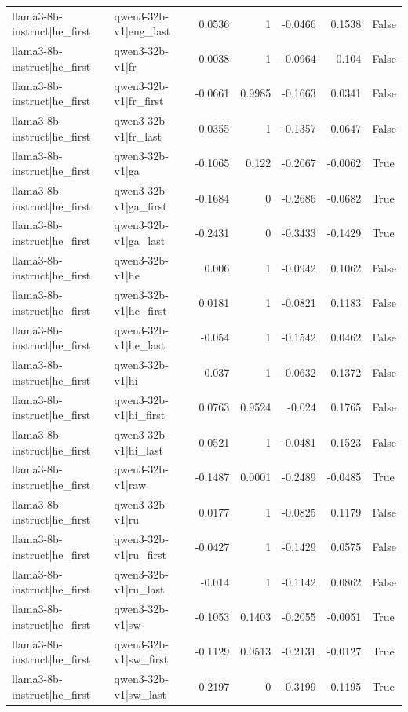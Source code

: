 \begin{table}
\begin{tabular}{l l r r r r l}
llama3-8b-instruct|he_first & qwen3-32b-v1|eng_last & 0.0536 & 1 & -0.0466 & 0.1538 & False \\
llama3-8b-instruct|he_first & qwen3-32b-v1|fr & 0.0038 & 1 & -0.0964 & 0.104 & False \\
llama3-8b-instruct|he_first & qwen3-32b-v1|fr_first & -0.0661 & 0.9985 & -0.1663 & 0.0341 & False \\
llama3-8b-instruct|he_first & qwen3-32b-v1|fr_last & -0.0355 & 1 & -0.1357 & 0.0647 & False \\
llama3-8b-instruct|he_first & qwen3-32b-v1|ga & -0.1065 & 0.122 & -0.2067 & -0.0062 & True \\
llama3-8b-instruct|he_first & qwen3-32b-v1|ga_first & -0.1684 & 0 & -0.2686 & -0.0682 & True \\
llama3-8b-instruct|he_first & qwen3-32b-v1|ga_last & -0.2431 & 0 & -0.3433 & -0.1429 & True \\
llama3-8b-instruct|he_first & qwen3-32b-v1|he & 0.006 & 1 & -0.0942 & 0.1062 & False \\
llama3-8b-instruct|he_first & qwen3-32b-v1|he_first & 0.0181 & 1 & -0.0821 & 0.1183 & False \\
llama3-8b-instruct|he_first & qwen3-32b-v1|he_last & -0.054 & 1 & -0.1542 & 0.0462 & False \\
llama3-8b-instruct|he_first & qwen3-32b-v1|hi & 0.037 & 1 & -0.0632 & 0.1372 & False \\
llama3-8b-instruct|he_first & qwen3-32b-v1|hi_first & 0.0763 & 0.9524 & -0.024 & 0.1765 & False \\
llama3-8b-instruct|he_first & qwen3-32b-v1|hi_last & 0.0521 & 1 & -0.0481 & 0.1523 & False \\
llama3-8b-instruct|he_first & qwen3-32b-v1|raw & -0.1487 & 0.0001 & -0.2489 & -0.0485 & True \\
llama3-8b-instruct|he_first & qwen3-32b-v1|ru & 0.0177 & 1 & -0.0825 & 0.1179 & False \\
llama3-8b-instruct|he_first & qwen3-32b-v1|ru_first & -0.0427 & 1 & -0.1429 & 0.0575 & False \\
llama3-8b-instruct|he_first & qwen3-32b-v1|ru_last & -0.014 & 1 & -0.1142 & 0.0862 & False \\
llama3-8b-instruct|he_first & qwen3-32b-v1|sw & -0.1053 & 0.1403 & -0.2055 & -0.0051 & True \\
llama3-8b-instruct|he_first & qwen3-32b-v1|sw_first & -0.1129 & 0.0513 & -0.2131 & -0.0127 & True \\
llama3-8b-instruct|he_first & qwen3-32b-v1|sw_last & -0.2197 & 0 & -0.3199 & -0.1195 & True \\

\end{tabular}
\end{table}

